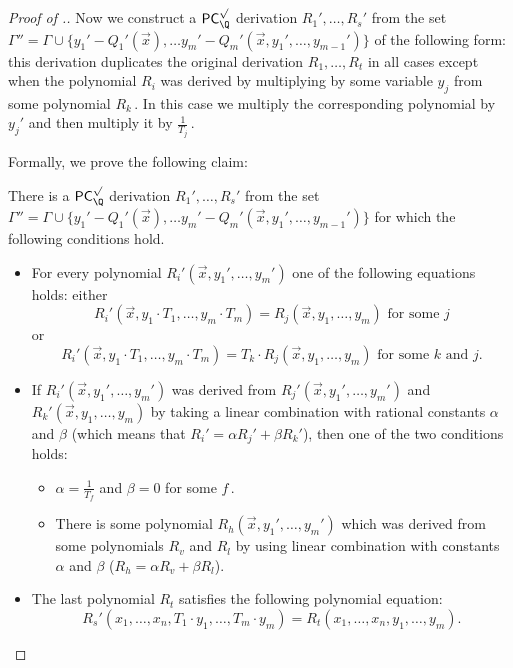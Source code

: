 \documentclass{toc}
\begin{document}
\begin{proof}[Proof of .]
Now we construct a $\mathsf{PC}_{\Q}^{\surd}$ derivation %
$R_1', \ldots, R_s'$ %
 from the set $\Gamma'' = \Gamma \cup \{y_1' - Q_1'(\vec x), \ldots y_m' - Q_m'(\vec x, y_1', \ldots, y_{m - 1}')\}$ of the following form: this derivation duplicates the original derivation %
$R_1, \ldots, R_t$ %
 in all cases except when the polynomial $R_i$ was derived by multiplying by some variable $y_j$ from some polynomial %
$R_k\,.$ %
 In this case we multiply the corresponding polynomial by $y_j'$ and then multiply it by %
$\frac{1}{T_j}\,.$ %

Formally, we prove the following claim:
\begin{claim}\label{cla:Q-Z trans}
%
  There is a $\mathsf{PC}_{\Q}^{\surd}$ derivation %
$R_1', \ldots, R_s'$ %
 from the set \\ $\Gamma'' = \Gamma \cup \{y_1' - Q_1'(\vec x), \ldots y_m' - Q_m'(\vec x, y_1', \ldots, y_{m - 1}')\}$ for which the following
%
conditions hold.  %
\begin{itemize}
    \item For every polynomial $R_i'(\vec x, y_1', \ldots, y_m')$ one of the following equations holds:
    	either 
	$$
	R_i'(\vec x, y_1 \cdot T_1, \ldots, y_m \cdot T_m) = R_j(\vec x, y_1, \ldots, y_m) \text{ for some } j
	$$ 
	or 
	$$
	R_i'(\vec x, y_1 \cdot T_1, \ldots, y_m \cdot T_m) =  T_k \cdot R_j(\vec x, y_1, \ldots, y_m) \text{ for some } k \text{ and } j.
	$$ 
    \item If $R_i'(\vec x, y_1', \ldots, y_m')$ was derived from $R_j'(\vec x, y_1', \ldots, y_m')$ and $R_k'(\vec x, y_1, \ldots, y_m)$ by taking a linear combination with rational constants $\alpha$ and $\beta$ (which means that $R_i' = \alpha R_j' + \beta R_k'$), then one of the two conditions holds: 
	\begin{itemize}
	\item $\alpha = \frac{1}{T_f}$ and $\beta = 0$ for some %
$f\,.$ %
	\item There is some polynomial $R_h(\vec x, y_1', \ldots, y_m')$ which was derived from some polynomials $R_v$ and $R_l$ by using linear combination with constants $\alpha$ and $\beta$ ($R_h = \alpha R_v + \beta R_l$).
	\end{itemize}
%
    \item The last polynomial $R_t$ satisfies the following polynomial equation: %
    $$
    R_s'(x_1, \ldots, x_n, T_1 \cdot y_1, \ldots, T_m \cdot y_m) = R_t(x_1, \ldots, x_n, y_1, \ldots, y_m).
    $$
\end{itemize}


\end{claim}
\end{proof}
\end{document}
